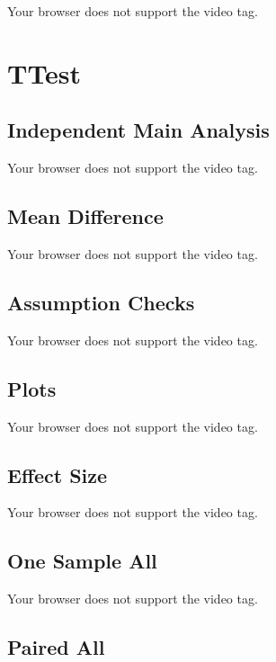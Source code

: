 \documentclass[
  letterpaper,
  DIV=11,
  numbers=noendperiod]{scrreprt}
\begin{document}
Your browser does not support the video tag.

\hypertarget{ttest}{%
\section{TTest}\label{ttest}}

\hypertarget{independent-main-analysis}{%
\subsection{Independent Main Analysis}\label{independent-main-analysis}}

Your browser does not support the video tag.

\hypertarget{mean-difference}{%
\subsection{Mean Difference}\label{mean-difference}}

Your browser does not support the video tag.

\hypertarget{assumption-checks-1}{%
\subsection{Assumption Checks}\label{assumption-checks-1}}

Your browser does not support the video tag.

\hypertarget{plots}{%
\subsection{Plots}\label{plots}}

Your browser does not support the video tag.

\hypertarget{effect-size}{%
\subsection{Effect Size}\label{effect-size}}

Your browser does not support the video tag.

\hypertarget{one-sample-all}{%
\subsection{One Sample All}\label{one-sample-all}}

Your browser does not support the video tag.

\hypertarget{paired-all}{%
\subsection{Paired All}\label{paired-all}}
\end{document}
